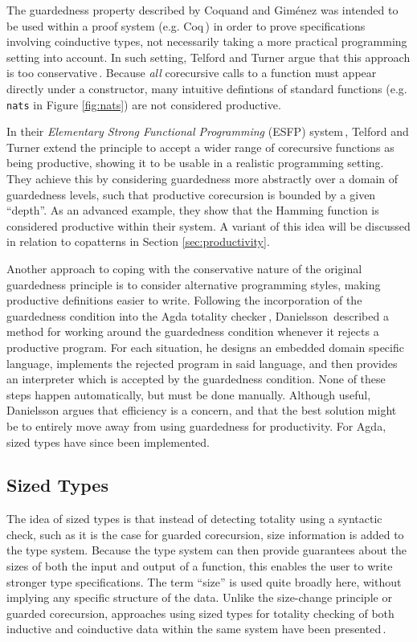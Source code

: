 The guardedness property described by Coquand and Gim\'{e}nez was intended to be used within a proof system (e.g. Coq\,\citep{Coq:manual}) in order to prove specifications involving coinductive types, not necessarily taking a more practical programming setting into account. In such setting, Telford and Turner argue that this approach is too conservative\,\citep{Telford98ensuringthe}. Because \emph{all} corecursive calls to a function must appear directly under a constructor, many intuitive defintions of standard functions (e.g. \texttt{nats} in Figure \ref{fig:nats}) are not considered productive.

In their \emph{Elementary Strong Functional Programming} (ESFP) system\,\citep{Telford97ensuringstreams,Telford98ensuringthe}, Telford and Turner extend the principle to accept a wider range of corecursive functions as being productive, showing it to be usable in a realistic programming setting. They achieve this by considering guardedness more abstractly over a domain of guardedness levels, such that productive corecursion is bounded by a given ``depth''. As an advanced example, they show that the Hamming function is considered productive within their system. A variant of this idea will be discussed in relation to copatterns in Section \ref{sec:productivity}.

Another approach to coping with the conservative nature of the original guardedness principle is to consider alternative programming styles, making productive definitions easier to write. Following the incorporation of the guardedness condition into the Agda totality checker\,\citep{AltenkirchNAD10}, Danielsson\,\citep{Danielsson10beatingthe} described a method for working around the guardedness condition whenever it rejects a productive program. For each situation, he designs an embedded domain specific language, implements the rejected program in said language, and then provides an interpreter which is accepted by the guardedness condition. None of these steps happen automatically, but must be done manually. Although useful, Danielsson argues that efficiency is a concern, and that the best solution might be to entirely move away from using guardedness for productivity. For Agda, sized types have since been implemented.


\subsection{Sized Types}
\label{sec:sized_types}
The idea of sized types is that instead of detecting totality using a syntactic check, such as it is the case for guarded corecursion, size information is added to the type system. Because the type system can then provide guarantees about the sizes of both the input and output of a function, this enables the user to write stronger type specifications. The term ``size'' is used quite broadly here, without implying any specific structure of the data. Unlike the size-change principle or guarded corecursion, approaches using sized types for totality checking of both inductive and coinductive data within the same system have been presented\,\citep{Abel13Wellfounded}.

